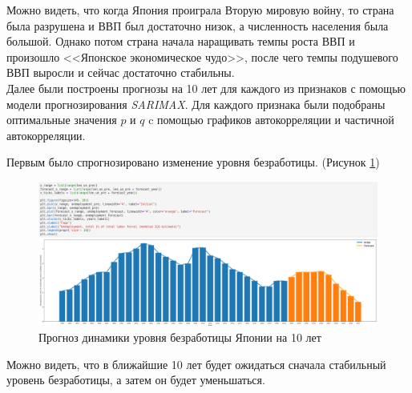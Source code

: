 \documentclass[14pt,fleqn]{extarticle}
\begin{document}
	Можно видеть, что когда Япония проиграла Вторую мировую войну, то страна была разрушена и ВВП был достаточно низок, а численность населения была большой. Однако потом страна начала наращивать темпы роста ВВП и произошло <<Японское экономическое чудо>>, после чего темпы подушевого ВВП выросли и сейчас достаточно стабильны.\\
	
	Далее были построены прогнозы на 10 лет для каждого из признаков с помощью модели прогнозирования \textit{SARIMAX}. Для каждого признака были подобраны оптимальные значения $p$ и $q$ c помощью графиков автокорреляции и частичной автокорреляции.\\
	
	\newpage
	
	Первым было спрогнозировано изменение уровня безработицы. (Рисунок \ref{fig:japan_unemployment_plot_forecast})
	
	\begin{figure}[h]
		\centering \includegraphics[scale=0.42]{japan_unemployment_plot_forecast}
		\caption{Прогноз динамики уровня безработицы Японии на 10 лет}
		\label{fig:japan_unemployment_plot_forecast}
	\end{figure}

	Можно видеть, что в ближайшие 10 лет будет ожидаться сначала стабильный уровень безработицы, а затем он будет уменьшаться.
\end{document}
